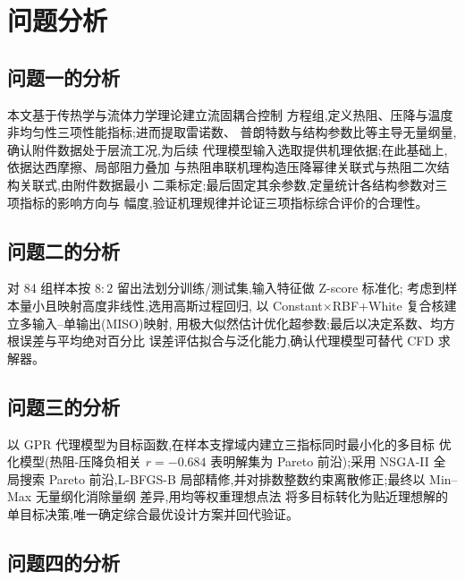 \section{问题分析}

\subsection{问题一的分析}

本文基于传热学与流体力学理论\cite{White2016,Yang2006}建立流固耦合控制
方程组,定义热阻、压降与温度非均匀性三项性能指标;进而提取雷诺数、
普朗特数与结构参数比等主导无量纲量,确认附件数据处于层流工况,为后续
代理模型输入选取提供机理依据;在此基础上,依据达西摩擦、局部阻力叠加
与热阻串联机理构造压降幂律关联式与热阻二次结构关联式,由附件数据最小
二乘标定;最后固定其余参数,定量统计各结构参数对三项指标的影响方向与
幅度,验证机理规律并论证三项指标综合评价的合理性。

\subsection{问题二的分析}

对 84 组样本按 $8:2$ 留出法划分训练/测试集,输入特征做 Z-score 标准化;
考虑到样本量小且映射高度非线性,选用高斯过程回归\cite{Rasmussen2006},
以 Constant$\times$RBF+White 复合核建立多输入--单输出(MISO)映射,
用极大似然估计优化超参数;最后以决定系数、均方根误差与平均绝对百分比
误差评估拟合与泛化能力,确认代理模型可替代 CFD 求解器。

\subsection{问题三的分析}

以 GPR 代理模型为目标函数,在样本支撑域内建立三指标同时最小化的多目标
优化模型(热阻-压降负相关 $r=-0.684$ 表明解集为 Pareto 前沿);采用
NSGA-II\cite{Deb2002} 全局搜索 Pareto 前沿,L-BFGS-B\cite{Byrd1995,Chen2005}
局部精修,并对排数整数约束离散修正;最终以 Min--Max 无量纲化消除量纲
差异,用均等权重理想点法\cite{Hwang1981} 将多目标转化为贴近理想解的
单目标决策,唯一确定综合最优设计方案并回代验证。

\subsection{问题四的分析}

